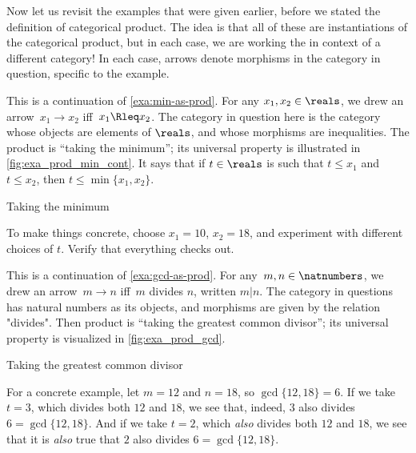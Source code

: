 Now let us revisit the examples that were given earlier, before we stated the definition of categorical product. The idea is that all of these are instantiations of the categorical product, but in each case, we are working the in context of a different category! In each case, arrows denote morphisms in the category in question, specific to the example. 


\begin{example}\label{exa:min-as-prod-cont}
This is a continuation of \cref{exa:min-as-prod}. For any $x_1,x_2\in \reals$, we drew an arrow~$x_1\to x_2$ iff~$x_1\Rleq x_2$. The category in question here is the category whose objects are elements of $\reals$, and whose morphisms are inequalities. The product is ``taking the minimum''; its universal property is illustrated in \cref{fig:exa_prod_min_cont}. It says that if $t \in \reals$ is such that $t \leq x_1$ and $t \leq x_2$, then $t \leq \min \{ x_1, x_2 \}$. 
  \begin{marginfigure}
  \begin{center}
  \end{center}
    \caption{Taking the minimum}
    \label{fig:exa_prod_min_cont}
  \end{marginfigure}
To make things concrete, choose $x_1 = 10$, $x_2 = 18$, and experiment with different choices of $t$. Verify that everything checks out. 
\end{example}

\begin{example}\label{exa:gcd-as-prod-cont}
This is a continuation of \cref{exa:gcd-as-prod}. For any~$m, n \in \natnumbers$, we drew an arrow~$m \to n$ iff~$m$ divides $n$, written $m | n$. The category in questions has natural numbers as its objects, and morphisms are given by the relation "divides". Then product is ``taking the greatest common divisor''; its universal property is visualized in \cref{fig:exa_prod_gcd}. 
  \begin{marginfigure}
  \begin{center}
  \end{center}
    \caption{Taking the greatest common divisor}
    \label{fig:exa_prod_gcd_cont}
  \end{marginfigure}
 For a concrete example, let $m = 12$ and $n = 18$, so $\gcd \{12, 18 \} = 6$. If we take $t = 3$, which divides both $12$ and $18$, we see that, indeed, $3$ also divides $6 = \gcd \{12, 18 \}$. And if we take $t = 2$, which \emph{also} divides both $12$ and $18$, we see that it is \emph{also} true that $2$ also divides $6 = \gcd \{12, 18 \}$. 
\end{example}

